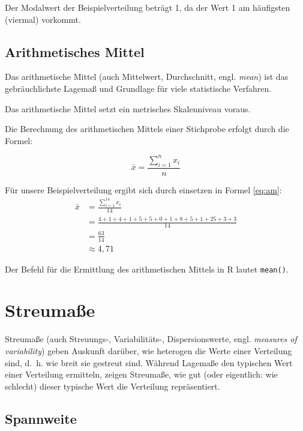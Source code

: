 \documentclass[
  11pt,
  ngerman,
  a4paper,
]{report}
\newenvironment{rtip}{
  \medskip
  \begin{tcolorbox}[colframe=purple,colback=light_gray,title=Softwarehinweis]
}{
  \end{tcolorbox}
  \medskip
}
\begin{document}
Der Modalwert der Beispielverteilung beträgt 1, da der Wert 1 am häufigsten (viermal) vorkommt.

\hypertarget{arithmetisches-mittel}{%
\subsection{Arithmetisches Mittel}\label{arithmetisches-mittel}}

Das arithmetische Mittel (auch Mittelwert, Durchschnitt, engl. \emph{mean}) ist das gebräuchlichste Lagemaß und Grundlage für viele statistische Verfahren.

Das arithmetische Mittel setzt ein metrisches Skalenniveau voraus.

Die Berechnung des arithmetischen Mittels einer Stichprobe erfolgt durch die Formel:

\[
 \bar{x}=\frac{\sum\limits _{i=1}^{n}x_{i}}{n}
 \label{eq:am}
\]

Für unsere Beispielverteilung ergibt sich durch einsetzen in Formel \eqref{eq:am}:
\[
  \begin{aligned}
     \bar{x}&=\frac{\sum\limits _{i=1}^{14}x_{i}}{14} \\[4pt]
            &=\frac{4+1+4+1+5+5+0+1+8+5+1+25+3+3}{14} \\[4pt]
            &=\frac{63}{14}\\[4pt]
            &\approx 4{,}71
  \end{aligned}
\]

\begin{rtip}
Der Befehl für die Ermittlung des arithmetischen Mittels in R lautet \verb|mean()|.
\end{rtip}

\hypertarget{streumauxdfe}{%
\section{Streumaße}\label{streumauxdfe}}

Streumaße (auch Streuungs-, Variabilitäts-, Dispersionswerte, engl. \emph{measures of variability}) geben Auskunft darüber, wie heterogen die Werte einer Verteilung sind, d.~h. wie breit sie gestreut sind. Während Lagemaße den typischen Wert einer Verteilung ermitteln, zeigen Streumaße, wie gut (oder eigentlich: wie schlecht) dieser typische Wert die Verteilung repräsentiert.

\hypertarget{spannweite}{%
\subsection{Spannweite}\label{spannweite}}
\end{document}
